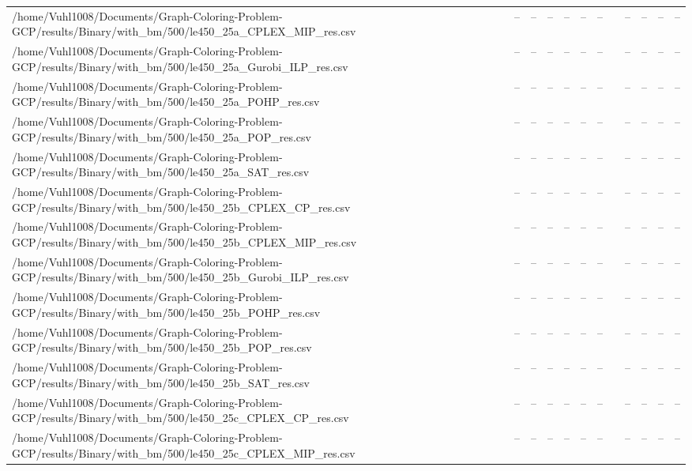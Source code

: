\begin{table}[htbp]
\begin{tabular}{llllllllllll}
/home/Vuhl1008/Documents/Graph-Coloring-Problem-GCP/results/Binary/with\_bm/500/le450\_25a\_CPLEX\_MIP\_res.csv & -- & -- & -- & -- & -- & -- & {} & -- & -- & -- & -- \\
/home/Vuhl1008/Documents/Graph-Coloring-Problem-GCP/results/Binary/with\_bm/500/le450\_25a\_Gurobi\_ILP\_res.csv & -- & -- & -- & -- & -- & -- & {} & -- & -- & -- & -- \\
/home/Vuhl1008/Documents/Graph-Coloring-Problem-GCP/results/Binary/with\_bm/500/le450\_25a\_POHP\_res.csv & -- & -- & -- & -- & -- & -- & {} & -- & -- & -- & -- \\
/home/Vuhl1008/Documents/Graph-Coloring-Problem-GCP/results/Binary/with\_bm/500/le450\_25a\_POP\_res.csv & -- & -- & -- & -- & -- & -- & {} & -- & -- & -- & -- \\
/home/Vuhl1008/Documents/Graph-Coloring-Problem-GCP/results/Binary/with\_bm/500/le450\_25a\_SAT\_res.csv & -- & -- & -- & -- & -- & -- & {} & -- & -- & -- & -- \\
/home/Vuhl1008/Documents/Graph-Coloring-Problem-GCP/results/Binary/with\_bm/500/le450\_25b\_CPLEX\_CP\_res.csv & -- & -- & -- & -- & -- & -- & {} & -- & -- & -- & -- \\
/home/Vuhl1008/Documents/Graph-Coloring-Problem-GCP/results/Binary/with\_bm/500/le450\_25b\_CPLEX\_MIP\_res.csv & -- & -- & -- & -- & -- & -- & {} & -- & -- & -- & -- \\
/home/Vuhl1008/Documents/Graph-Coloring-Problem-GCP/results/Binary/with\_bm/500/le450\_25b\_Gurobi\_ILP\_res.csv & -- & -- & -- & -- & -- & -- & {} & -- & -- & -- & -- \\
/home/Vuhl1008/Documents/Graph-Coloring-Problem-GCP/results/Binary/with\_bm/500/le450\_25b\_POHP\_res.csv & -- & -- & -- & -- & -- & -- & {} & -- & -- & -- & -- \\
/home/Vuhl1008/Documents/Graph-Coloring-Problem-GCP/results/Binary/with\_bm/500/le450\_25b\_POP\_res.csv & -- & -- & -- & -- & -- & -- & {} & -- & -- & -- & -- \\
/home/Vuhl1008/Documents/Graph-Coloring-Problem-GCP/results/Binary/with\_bm/500/le450\_25b\_SAT\_res.csv & -- & -- & -- & -- & -- & -- & {} & -- & -- & -- & -- \\
/home/Vuhl1008/Documents/Graph-Coloring-Problem-GCP/results/Binary/with\_bm/500/le450\_25c\_CPLEX\_CP\_res.csv & -- & -- & -- & -- & -- & -- & {} & -- & -- & -- & -- \\
/home/Vuhl1008/Documents/Graph-Coloring-Problem-GCP/results/Binary/with\_bm/500/le450\_25c\_CPLEX\_MIP\_res.csv & -- & -- & -- & -- & -- & -- & {} & -- & -- & -- & -- \\

\end{tabular}
\end{table}
